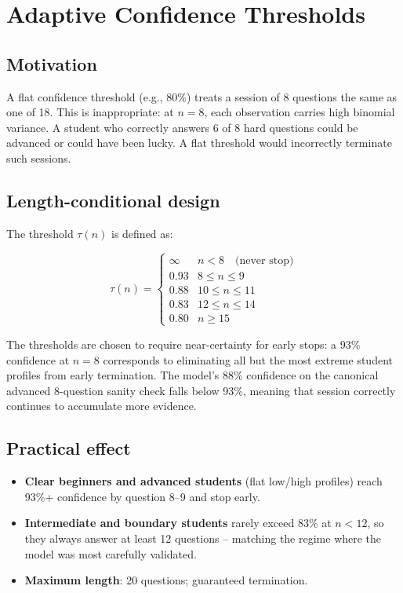 \documentclass[12pt,a4paper]{article}
\begin{document}
\section{Adaptive Confidence Thresholds}
\label{sec:thresholds}

\subsection{Motivation}

A flat confidence threshold (e.g., 80\%) treats a session of 8 questions the same as
one of 18. This is inappropriate: at $n=8$, each observation carries high binomial
variance. A student who correctly answers 6 of 8 hard questions could be advanced or
could have been lucky. A flat threshold would incorrectly terminate such sessions.

\subsection{Length-conditional design}

The threshold $\tau(n)$ is defined as:

\[
\tau(n) = \begin{cases}
  \infty    & n < 8  \quad\text{(never stop)} \\
  0.93      & 8 \leq n \leq 9 \\
  0.88      & 10 \leq n \leq 11 \\
  0.83      & 12 \leq n \leq 14 \\
  0.80      & n \geq 15
\end{cases}
\]

The thresholds are chosen to require near-certainty for early stops: a 93\%
confidence at $n=8$ corresponds to eliminating all but the most extreme student
profiles from early termination. The model's 88\% confidence on the canonical
advanced 8-question sanity check falls below 93\%, meaning that session correctly
continues to accumulate more evidence.

\subsection{Practical effect}

\begin{itemize}[noitemsep]
  \item \textbf{Clear beginners and advanced students} (flat low/high profiles)
        reach 93\%+ confidence by question 8--9 and stop early.
  \item \textbf{Intermediate and boundary students} rarely exceed 83\% at $n<12$,
        so they always answer at least 12 questions -- matching the regime where
        the model was most carefully validated.
  \item \textbf{Maximum length}: 20 questions; guaranteed termination.
\end{itemize}
\end{document}
